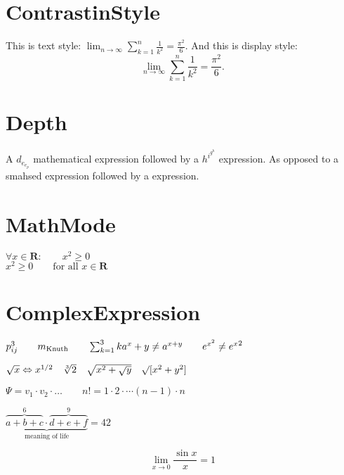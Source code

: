 \documentclass[a4paper, 12pt]{article}
\begin{document}
\section{ContrastinStyle}
This is text style: %
$\lim_{n \to \infty} %
\sum_{k=1}^n \frac{1}{k^2} %
= \frac{\pi^2}{6}.$ %
And this is display style:
\[
\lim_{n \to \infty} %
\sum_{k=1}^n \frac{1}{k^2} %
= \frac{\pi^2}{6}.
\tag{3.3} %
\]

\section{Depth}
A $d_{e_{e_p}}$ mathematical expression followed by %
a $h^{i^{g^h}}$ expression. As opposed to a smahsed %
 expression followed by a %
 expression.

\section{MathMode}
$\forall x \in \mathbf{R}: %
\qquad x^2 \geq 0$ \\%
$x^2 \geq 0 \qquad \text{for all } x \in \mathbf{R}$

\section{ComplexExpression}
$p^3_{ij} \qquad m_\text{Knuth} \qquad %
\sum_{k=1}^3 k \\
a^x + y \neq a^{x+y} \qquad %
e^{x^2} \neq {e^x}^2$

$\sqrt{x} \Leftrightarrow x^{1/2}
\quad \sqrt[3]{2} %
\quad \sqrt{x^2 + \sqrt{y}}
\quad \surd[x^2 + y^2]$

$\Psi = v_1 \cdot v_2 \cdot \ldots
\qquad n! = 1 \cdot 2 \cdot \cdots
(n-1) \cdot n$

$\underbrace{
\overbrace{a+b+c}^6 \cdot
\overbrace{d+e+f}^9}_\text{meaning of life} = 42$

\[
\lim_{x \to 0} \frac{\sin x}{x} =
1
\]
\end{document}
